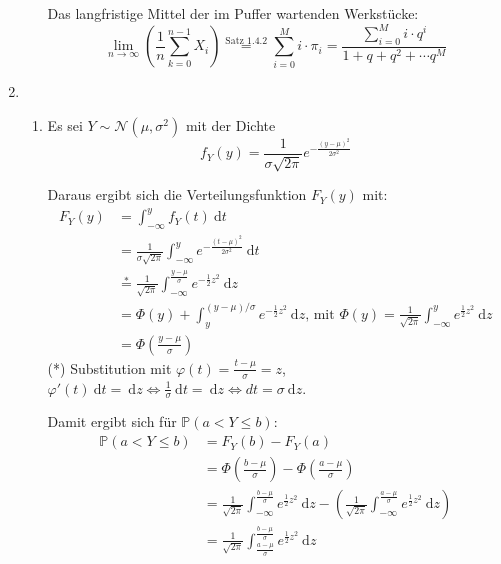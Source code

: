 \documentclass[a4paper]{scrartcl}
\newcommand{\dif}{\ \mathrm{d}}
\def \blattnr {5}
\begin{document}
\begin{enumerate}[label=\bfseries \blattnr.\arabic*]
\begin{enumerate}
            Das langfristige Mittel der im Puffer wartenden Werkstücke:
            \begin{equation*}
                \lim_{n \to \infty} \left( \frac{1}{n} \sum_{k=0}^{n-1} X_i \right)
                \stackrel{\text{Satz 1.4.2}}{=} \sum_{i=0}^M i \cdot \pi_i
                = \frac{\sum_{i=0}^M i \cdot q^i}{1 + q + q^2 + \dotsb q^M}
            \end{equation*}

        \end{enumerate}
   
    \item
        \begin{enumerate}
            \item
	      Es sei $Y \sim \mathcal{N}(\mu, \sigma^2)$ mit der Dichte
	      \begin{equation*}
		  f_Y(y) = \frac1{\sigma\sqrt{2\pi}} e^{-\frac{(y-\mu)^2}{2\sigma^2}}
	      \end{equation*}
	      
	      Daraus ergibt sich die Verteilungsfunktion $F_Y(y)$ mit:
	      \begin{equation*}
		\begin{split}
		  F_Y(y) 
		  &= \int_{-\infty}^y f_Y(t) \dif t \\ 
		  &= \frac1{\sigma\sqrt{2\pi}} \int_ {-\infty}^y e^{-\frac{(t-\mu)^2}{2\sigma^2}} \dif t\\
		  &\stackrel{*}{=} \frac1{\sqrt{2\pi}} \int_{-\infty}^{\frac{y-\mu}\sigma} e^{-\frac12z^2} \dif z \\
		  &= \Phi(y) + \int_y^{(y-\mu)/\sigma} e^{-\frac12z^2} \dif z \text{, mit } \Phi(y) = \frac1{\sqrt{2\pi}} \int_{-\infty}^y e^{\frac12z^2} \dif z \\
		  & =\Phi\left(\frac{y-\mu}\sigma\right)
		 \end{split}
	      \end{equation*}
	      (*) Substitution mit $\varphi(t) = \frac{t-\mu}{\sigma} = z$, \\
	      $\varphi'(t) \dif t = \dif z \Leftrightarrow \frac1\sigma \dif t = \dif z \Leftrightarrow dt = \sigma \dif z$.
	      
	      Damit ergibt sich für $\mathbb{P}(a < Y \leq b)$:
	      \begin{equation*}
		\begin{split}
		  \mathbb{P}(a < Y \leq b)
		  &= F_Y(b) - F_Y(a) \\
		  &= \Phi\left( \frac{b - \mu}\sigma\right) - \Phi\left(\frac{a-\mu}\sigma\right) \\
		  &= \frac1{\sqrt{2\pi}} \int_{-\infty}^{\frac{b - \mu}\sigma} e^{\frac12z^2} \dif z - \left(\frac1{\sqrt{2\pi}} \int_{-\infty}^{\frac{a-\mu}\sigma} e^{\frac12z^2} \dif z \right) \\
		  &= \frac1{\sqrt{2\pi}} \int_{\frac{a-\mu}\sigma}^{\frac{b - \mu}\sigma} e^{\frac12z^2} \dif z 
		 \end{split}
	      \end{equation*}
	  

\end{enumerate}
\end{enumerate}
\end{document}
